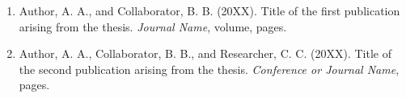 
\begin{enumerate}[leftmargin=*]
  \item Author, A. A., and Collaborator, B. B. (20XX). Title of the first publication arising from the thesis. \emph{Journal Name}, volume, pages.
  \item Author, A. A., Collaborator, B. B., and Researcher, C. C. (20XX). Title of the second publication arising from the thesis. \emph{Conference or Journal Name}, pages.
\end{enumerate}
